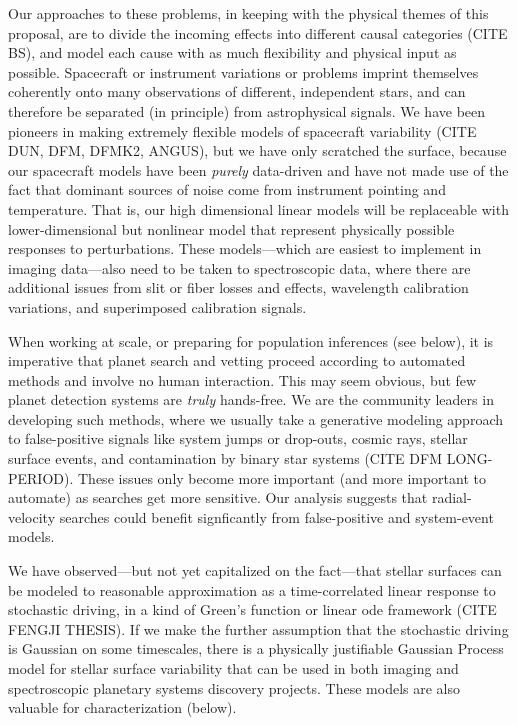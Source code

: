 \documentclass[12pt]{article}
\begin{document}
Our approaches to these problems, in keeping with the physical themes
of this proposal, are to divide the incoming effects into different
causal categories (CITE BS), and model each cause with as much
flexibility and physical input as possible. Spacecraft or instrument
variations or problems imprint themselves coherently onto many
observations of different, independent stars, and can therefore be
separated (in principle) from astrophysical signals. We have been
pioneers in making extremely flexible models of spacecraft variability
(CITE DUN, DFM, DFMK2, ANGUS), but we have only scratched the surface,
because our spacecraft models have been \emph{purely} data-driven and
have not made use of the fact that dominant sources of noise come from
instrument pointing and temperature. That is, our high dimensional
linear models will be replaceable with lower-dimensional but nonlinear
model that represent physically possible responses to perturbations.
These models---which are easiest to implement in imaging data---also
need to be taken to spectroscopic data, where there are additional
issues from slit or fiber losses and effects, wavelength calibration
variations, and superimposed calibration signals.

When working at scale, or preparing for population inferences (see
below), it is imperative that planet search and vetting proceed
according to automated methods and involve no human interaction. This
may seem obvious, but few planet detection systems are \emph{truly}
hands-free. We are the community leaders in developing such methods,
where we usually take a generative modeling approach to false-positive
signals like system jumps or drop-outs, cosmic rays, stellar surface
events, and contamination by binary star systems (CITE DFM
LONG-PERIOD). These issues only become more important (and more
important to automate) as searches get more sensitive. Our analysis
suggests that radial-velocity searches could benefit signficantly from
false-positive and system-event models.

We have observed---but not yet capitalized on the fact---that stellar
surfaces can be modeled to reasonable approximation as a
time-correlated linear response to stochastic driving, in a kind of
Green's function or linear ode framework (CITE FENGJI THESIS). If we
make the further assumption that the stochastic driving is Gaussian on
some timescales, there is a physically justifiable Gaussian Process
model for stellar surface variability that can be used in both
imaging and spectroscopic planetary systems discovery projects. These
models are also valuable for characterization (below).
\end{document}
